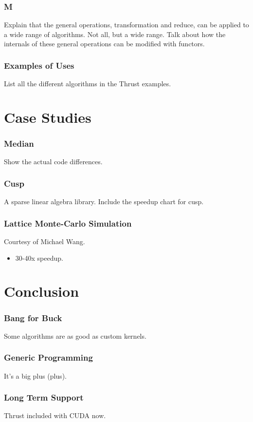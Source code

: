 \documentclass{beamer}
\begin{document}
\begin{frame}
  \frametitle{M}
  Explain that the general operations, transformation and
  reduce, can be applied to a wide range of algorithms.
  Not all, but a wide range. Talk about how the internals of
  these general operations can be modified with functors.
\end{frame}

\begin{frame}
  \frametitle{Examples of Uses}
  List all the different algorithms in the Thrust examples.
\end{frame}

\section{Case Studies}

\begin{frame}
  \frametitle{Median}
  Show the actual code differences.
\end{frame}

\begin{frame}
  \frametitle{Cusp}
  A sparse linear algebra library.
  Include the speedup chart for cusp.
\end{frame}

\begin{frame}
  \frametitle{Lattice Monte-Carlo Simulation}
  Courtesy of Michael Wang.
  \begin{itemize}
    \item 30-40x speedup.
  \end{itemize}
\end{frame}

\section{Conclusion}

\begin{frame}
  \frametitle{Bang for Buck}
  Some algorithms are as good as custom kernels.
\end{frame}

\begin{frame}
  \frametitle{Generic Programming}
  It's a big plus (plus).
\end{frame}

\begin{frame}
  \frametitle{Long Term Support}
  Thrust included with CUDA now.
\end{frame}
\end{document}
